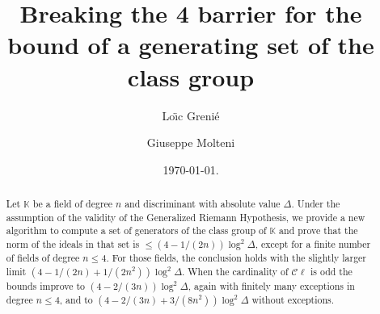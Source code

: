 \documentclass[a4paper,11pt]{amsart}
\newcommand{\field}[1]{\mathbb{{#1}}}
\newcommand{\K}{\field{{K}}}
\newcommand{\Cl}{\mathcal C\!\ell}
\theoremstyle{remark}
\begin{document}
\title[Breaking the 4 barrier]
{Breaking the 4 barrier for the bound of a generating set of the class group}

\author[L.~Greni\'{e}]{Lo\"{\i}c Greni\'{e}}
\address[L.~Greni\'{e}]{Dipartimento di Ingegneria gestionale, dell'informazione e della produzione\\
         Universit\`{a} di Bergamo\\
         viale Marconi 5\\
         I-24044 Dal\-mi\-ne\\
         Italy}

\author[G.~Molteni]{Giuseppe Molteni}
\address[G.~Molteni]{Dipartimento di Matematica\\
         Universit\`{a} di Milano\\
         via Saldini 50\\
         I-20133 Milano\\
         Italy}



\date{\today.
}

\begin{abstract}
Let $\K$ be a field of degree $n$ and discriminant with absolute value $\Delta$. Under the assumption
of the validity of the Generalized Riemann Hypothesis, we provide a new algorithm to compute a set of
generators of the class group of $\K$ and prove that the norm of the ideals in that set is $\leq
(4-1/(2n))\log^2\Delta$, except for a finite number of fields of degree $n\leq 4$. For those fields,
the conclusion holds with the slightly larger limit $(4-1/(2n)+1/(2n^2))\log^2\Delta$. When the
cardinality of $\Cl$ is odd the bounds improve to $(4-2/(3n))\log^2\Delta$, again with finitely many
exceptions in degree $n\leq 4$, and to $(4-2/(3n)+3/(8n^2))\log^2\Delta$ without exceptions.
\end{abstract}

\maketitle
\end{document}
